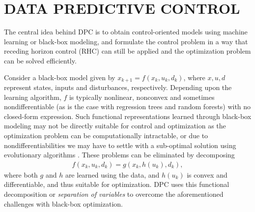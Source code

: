 \section{DATA PREDICTIVE CONTROL}
\label{S:dpc}

The central idea behind DPC is to obtain control-oriented models using machine learning or black-box modeling, and formulate the control problem in a way that receding horizon control (RHC) can still be applied and the optimization problem can be solved efficiently.

Consider a black-box model given by $x_{k+1}=f(x_k,u_k,d_k)$, where $x,u,d$ represent states, inputs and disturbances, respectively. Depending upon the learning algorithm, $f$ is typically nonlinear, nonconvex and sometimes nondifferentiable (as is the case with regression trees and random forests) with no closed-form expression. 
Such functional representations learned through black-box modeling may not be directly suitable for control and optimization as the optimization problem can be computationally intractable, or due to nondifferentiabilities we may have to settle with a sub-optimal solution using evolutionary algorithms \cite{Kusiak2009}.
These problems can be eliminated by decomposing 
\begin{align}
f(x_k,u_k,d_k)= g(x_k,h(u_k),d_k),
\label{E:sepvars}
\end{align}
where both $g$ and $h$ are learned using the data, and $h(u_k)$ is convex and differentiable, and thus suitable for optimization. DPC uses this functional decomposition or \textit{separation of variables} to overcome the aforementioned challenges with black-box optimization.


